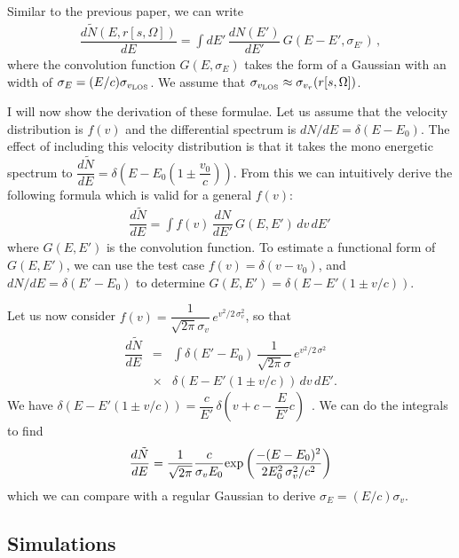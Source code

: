 \documentclass[aps,prl,10pt,twocolumn,superscriptaddress,showpacs]{revtex4-1}
\begin{document}
Similar to the previous paper, we can write
\begin{eqnarray}
\dfrac{d \tilde{N} (E, r[s, \Omega])}{dE} =\int dE' \, \dfrac{dN(E')}{dE'} \, G(E - E', \sigma_{E'}) \, ,
\label{eq:formula for modified dNdE}
\end{eqnarray}
where the convolution function $G(E, \sigma_E)$ takes the form of a Gaussian with an width of $\sigma_E = (E/c) \sigma_{v_{\rm LOS}}$.  We assume that $\sigma_{v_{\rm LOS}} \approx \sigma_{v_r}(r[s,\Omega])$.

I will now show the derivation of these formulae.  Let us assume that the velocity distribution is $f(v)$ and the differential spectrum is $dN/dE = \delta (E- E_0)$.  The effect of including this velocity distribution is that it takes the mono energetic spectrum to $\dfrac{d\tilde{N}}{dE} = \delta \left(E - E_0 (1 \pm \dfrac{v_0}{c})\right)$.  From this we can intuitively derive the following formula which is valid for a general $f(v)$:
\begin{eqnarray}
\dfrac{d\tilde{N}}{dE} = \int f(v) \, \dfrac{dN}{dE'} \, G(E, E') \, dv \, dE' \,
\label{eq:step 1}
\end{eqnarray}
where $G(E, E')$ is the convolution function.  To estimate a functional form of $G(E, E')$, we can use the test case $f(v) = \delta (v - v_0)$, and $dN/dE = \delta (E' - E_0)$ to determine $G(E, E') = \delta (E - E' (1 \pm v/c))$.

Let us now consider $f(v) = \dfrac{1}{\sqrt{2\pi} \sigma_v} \, e^{v^2/2 \, \sigma_v^2}$, so that
\begin{eqnarray}
\dfrac{d\tilde{N}}{dE} &=& \int \delta(E' - E_0) \, \dfrac{1}{\sqrt{2\pi} \sigma} \, e^{v^2/2 \, \sigma^2} \, \nonumber\\
&\times& \delta (E - E' (1 \pm v/c)) \, dv \, dE'.
\label{eq:step2}
\end{eqnarray}
We have $\delta (E - E' (1 \pm v/c)) = \dfrac{c}{E'} \, \delta \left(v + c - \dfrac{E}{E'} c \right)$\, .  We can do the integrals to find
\begin{eqnarray}
\dfrac{d\tilde{N}}{dE} =  \dfrac{1}{\sqrt{2\pi}} \dfrac{c}{\sigma_v E_0} {\rm exp} \left( \dfrac{-(E-E_0)^2}{2 E_0^2 \, \sigma_v^2/c^2} \right)
\label{eq:step3}
\end{eqnarray}
which we can compare with a regular Gaussian to derive $\sigma_E = (E/c) \sigma_v$.


\subsection{Simulations}
\label{sec:simulations}
\end{document}
